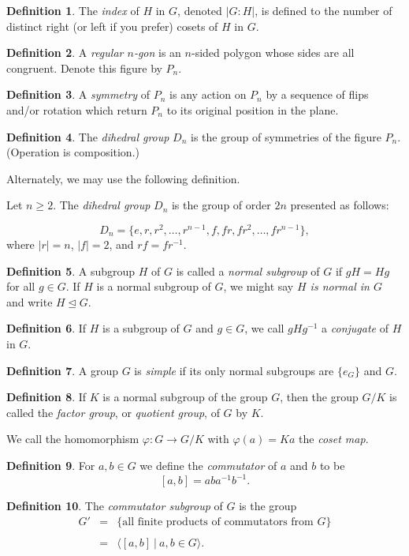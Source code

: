 \documentclass[12pt]{article}
\theoremstyle{definition}
\newtheorem*{defn}{Definition}
\newcommand{\nml}{\unlhd}
\begin{document}
\begin{defn}
	The \emph{index} of $H$ in $G$, denoted $|G:H|$, is defined to the number of distinct right (or left if you prefer) cosets of $H$ in $G$.
\end{defn}
\begin{defn}
	A \emph{regular $n$-gon} is an $n$-sided polygon whose sides are all congruent.  Denote this figure by $P_n$.
\end{defn}
\begin{defn}
	A \emph{symmetry} of $P_n$ is any action on $P_n$ by a sequence of flips and/or rotation which return $P_n$ to its original position in the plane.
\end{defn}
\begin{defn}
	The \emph{dihedral group} $D_n$ is the group of symmetries of the figure $P_n$.  (Operation is composition.)
	
	Alternately, we may use the following definition.
	
	Let $n\geq 2$.  The \emph{dihedral group} $D_n$ is the group of order $2n$ presented as follows:
	
	\[D_n=\{e,r,r^2,\dots,r^{n-1},f,fr,fr^2,\dots,fr^{n-1}\},\]
	where $|r|=n$, $|f|=2$, and $r f=fr^{-1}$.
\end{defn}
\begin{defn}
	A subgroup $H$ of $G$ is called a \emph{normal subgroup} of $G$ if $gH=Hg$ for all $g\in G$.
	If $H$ is a normal subgroup of $G$, we might say \emph{$H$ is normal in $G$} and write $H\nml G$.
\end{defn}
\begin{defn}
	If $H$ is a subgroup of $G$ and $g\in G$, we call $gHg^{-1}$ a \emph{conjugate} of $H$ in $G$.
\end{defn}
\begin{defn}
	A group $G$ is \emph{simple} if its only normal subgroups are $\{e_G\}$ and $G$.
\end{defn}
\begin{defn}
	If $K$ is a normal subgroup of the group $G$, then the group $G/K$ is called the \emph{factor group}, or \emph{quotient group}, of $G$ by $K$.
	
	We call the homomorphism $\varphi:G\to G/K$ with $\varphi(a)=Ka$ the \emph{coset map}.
\end{defn}
\begin{defn}
	For $a,b\in G$ we define the \emph{commutator} of $a$ and $b$ to be
	\[[a,b]=aba^{-1}b^{-1}.\]
\end{defn}
\begin{defn}
	The \emph{commutator subgroup} of $G$ is the group
	\[\begin{array}{rcl}
		G'&=&\{\text{all finite products of commutators from }G\}\\\\
		&=&\langle [a,b]\ |\ a,b\in G\rangle.
	\end{array}\]
\end{defn}
\end{document}
